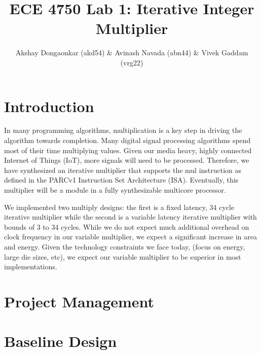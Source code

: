 \documentclass[11pt,twocolumn]{article}
\begin{document}
\title{ECE 4750 Lab 1: Iterative Integer Multiplier}
\author{Akshay Dongaonkar (akd54) \& Avinash Navada (abn44) \& Vivek Gaddam (vrg22)}
\maketitle

\section{Introduction}

In many programming algorithms, multiplication is a key step in driving the algorithm towards completion. 
Many digital signal processing algorithms spend most of their time multiplying values. Given our media heavy,
highly connected Internet of Things (IoT), more signals will need to be processed. Therefore, we have synthesized 
an iterative multiplier that supports the mul instruction as defined in the PARCv1 Instruction Set Architecture (ISA).
Eventually, this multiplier will be a module in a fully synthesizable multicore processor.

We implemented two multiply designs: the first is a fixed latency, 34 cycle iterative multiplier while the second is a variable latency
iterative multiplier with bounds of 3 to 34 cycles. While we do not expect much additional overhead on clock frequency
in our variable multiplier, we expect a significant increase in area and energy. Given the technology constraints we face today,
(focus on energy, large die sizes, etc), we expect our variable multiplier to be superior in most implementations. 


\section{Project Management}

\section{Baseline Design}
\end{document}
